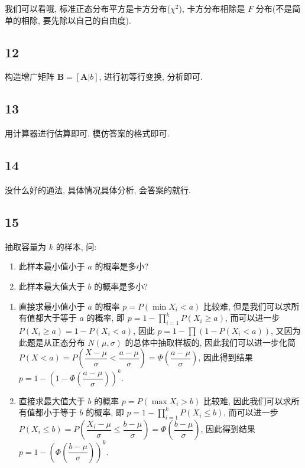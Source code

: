 \documentclass[a4paper, draft]{article}
\begin{document}
我们可以看哦, 标准正态分布平方是卡方分布($\chi^2$), 
卡方分布相除是 $F$ 分布(不是简单的相除, 要先除以自己的自由度).

\subsection*{12}

构造增广矩阵 $\textbf{B}=[\textbf{A}|b]$, 进行初等行变换, 分析即可.

\subsection*{13}

用计算器进行估算即可. 模仿答案的格式即可.

\subsection*{14}

没什么好的通法, 具体情况具体分析, 会答案的就行.

\subsection*{15}

抽取容量为 $k$ 的样本, 问:

\begin{enumerate}
    \item 此样本最小值小于 $a$ 的概率是多小?
    \item 此样本最大值大于 $b$ 的概率是多小?
\end{enumerate}

\begin{enumerate}
    \item 直接求最小值小于 $a$ 的概率 $p=P(\min X_i<a)$ 比较难, 
    但是我们可以求所有值都大于等于 $a$ 的概率, 
    即 $p=1-\prod_{i=1}^kP(X_i\geqslant a)$, 
    而可以进一步 $P(X_i\geqslant a)=1-P(X_i<a)$, 
    因此 $p=1-\prod(1-P(X_i<a))$, 
    又因为此题是从正态分布 $N(\mu,\sigma)$ 的总体中抽取样板的,
    因此我们可以进一步化简 $P(X<a)=P(\dfrac{X-\mu}{\sigma}<\dfrac{a-\mu}{\sigma})=\Phi(\dfrac{a-\mu}{\sigma})$, 
    因此得到结果 $p=1-(1-\Phi(\dfrac{a-\mu}{\sigma}))^k$.
    \item 直接求最大值大于 $b$ 的概率 $p=P(\max X_i>b)$ 比较难, 
    因此我们可以求所有值都小于等于 $b$ 的概率, 
    即 $p=1-\prod_{i=1}^k P(X_i\leqslant b)$,
    而可以进一步 $P(X_i\leqslant b)=P(\dfrac{X_i-\mu}{\sigma}\leqslant\dfrac{b-\mu}{\sigma})=\Phi(\dfrac{b-\mu}{\sigma})$, 
    因此得到结果 $p=1-(\Phi(\dfrac{b-\mu}{\sigma}))^k$.
\end{enumerate}
\end{document}

